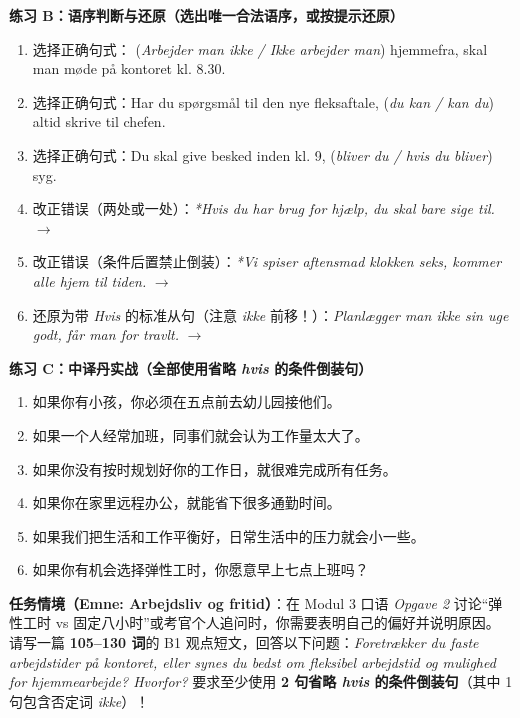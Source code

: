 \textbf{练习 B：语序判断与还原（选出唯一合法语序，或按提示还原）}
\begin{enumerate}
  \item 选择正确句式：\underline{\hspace{4.8cm}} (\textit{Arbejder man ikke / Ikke arbejder man}) hjemmefra, skal man møde på kontoret kl. 8.30.
  \item 选择正确句式：Har du spørgsmål til den nye fleksaftale, \underline{\hspace{3.2cm}} (\textit{du kan / kan du}) altid skrive til chefen.
  \item 选择正确句式：Du skal give besked inden kl. 9, \underline{\hspace{3.6cm}} (\textit{bliver du / hvis du bliver}) syg.
  \item 改正错误（两处或一处）：\textit{*Hvis du har brug for hjælp, du skal bare sige til.} $\rightarrow$
  \item 改正错误（条件后置禁止倒装）：\textit{*Vi spiser aftensmad klokken seks, kommer alle hjem til tiden.} $\rightarrow$
  \item 还原为带 \textit{Hvis} 的标准从句（注意 \textit{ikke} 前移！）：\textit{Planlægger man ikke sin uge godt, får man for travlt.} $\rightarrow$
\end{enumerate}

\textbf{练习 C：中译丹实战（全部使用省略 \textit{hvis} 的条件倒装句）}
\begin{enumerate}
  \item 如果你有小孩，你必须在五点前去幼儿园接他们。
  \item 如果一个人经常加班，同事们就会认为工作量太大了。
  \item 如果你没有按时规划好你的工作日，就很难完成所有任务。
  \item 如果你在家里远程办公，就能省下很多通勤时间。
  \item 如果我们把生活和工作平衡好，日常生活中的压力就会小一些。
  \item 如果你有机会选择弹性工时，你愿意早上七点上班吗？
\end{enumerate}


\begin{tcolorbox}[enhanced, breakable, colback=NCDBgGray, colframe=NCDGray, coltitle=white, fonttitle=\bfseries, title={DU3 Modul 3 实战微任务（对标 Mundtlig Opgave 2 观点讨论 / 书面短论 · 100+ 词）}, arc=2pt, boxrule=0.8pt, borderline west={3pt}{0pt}{NCDRed}, left=10pt, right=10pt, top=7pt, bottom=7pt]
\small
\textbf{任务情境（Emne: Arbejdsliv og fritid）}：在 Modul 3 口语 \textit{Opgave 2} 讨论“弹性工时 vs 固定八小时”或考官个人追问时，你需要表明自己的偏好并说明原因。\\
请写一篇 \textbf{105--130 词}的 B1 观点短文，回答以下问题：\textit{Foretrækker du faste arbejdstider på kontoret, eller synes du bedst om fleksibel arbejdstid og mulighed for hjemmearbejde? Hvorfor?} 要求至少使用 \textbf{2 句省略 \textit{hvis} 的条件倒装句}（其中 1 句包含否定词 \textit{ikke}）！
\end{tcolorbox}

